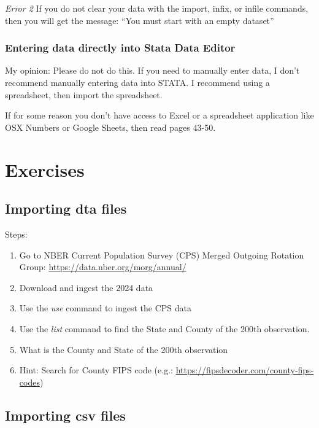 \documentclass[
]{book}
\providecommand{\tightlist}{%
  \setlength{\itemsep}{0pt}\setlength{\parskip}{0pt}}
\begin{document}
\emph{Error 2}
If you do not clear your data with the import, infix, or infile commands, then you will get the message:
``You must start with an empty dataset''

\subsection{Entering data directly into Stata Data Editor}\label{entering-data-directly-into-stata-data-editor}

My opinion: Please do not do this. If you need to manually enter data, I don't recommend manually entering data into STATA. I recommend using a spreadsheet, then import the
spreadsheet.

If for some reason you don't have access to Excel or a spreadsheet application
like OSX Numbers or Google Sheets, then read pages 43-50.

\chapter{Exercises}\label{exercises}

\section{Importing dta files}\label{importing-dta-files}

Steps:

\begin{enumerate}
\def\labelenumi{\arabic{enumi}.}
\tightlist
\item
  Go to NBER Current Population Survey (CPS) Merged Outgoing Rotation Group: \url{https://data.nber.org/morg/annual/}
\item
  Download and ingest the 2024 data
\item
  Use the \emph{use} command to ingest the CPS data
\item
  Use the \emph{list} command to find the State and County of the 200th observation.
\item
  What is the County and State of the 200th observation
\item
  Hint: Search for County FIPS code (e.g.: \url{https://fipsdecoder.com/county-fips-codes})
\end{enumerate}

\section{Importing csv files}\label{importing-csv-files}
\end{document}
